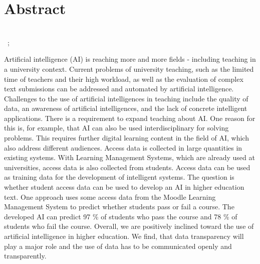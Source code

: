 \chapter*{Abstract}
\begin{center}
  \DocumentThesisTitle
  \\
  \vspace{.3cm}
  \DocumentAuthorPrename\ \DocumentAuthorName ; \DocumentSecondAuthorPrename \DocumentSecondAuthorName
\end{center}
Artificial intelligence (AI) is reaching more and more fields - including teaching in a university context. Current problems of university teaching, such as the limited time of teachers and their high workload, as well as the evaluation of complex text submissions can be addressed and automated by artificial intelligence. Challenges to the use of artificial intelligences in teaching include the quality of data, an awareness of artificial intelligences, and the lack of concrete intelligent applications. There is a requirement to expand teaching about AI. One reason for this is, for example, that AI can also be used interdisciplinary for solving problems. This requires further digital learning content in the field of AI, which also address different audiences. Access data is collected in large quantities in existing systems. With Learning Management Systems, which are already used at universities, access data is also collected from students. Access data can be used as training data for the development of intelligent systems. The question is whether student access data can be used to develop an AI in higher education text. One approach uses some access data from the Moodle Learning Management System to predict whether students pass or fail a course. The developed AI can predict 97 \% of students who pass the course and 78 \% of students who fail the course. Overall, we are positively inclined toward the use of artificial intelligence in higher education. We find, that data transparency will play a major role and the use of data has to be communicated openly and transparently.

